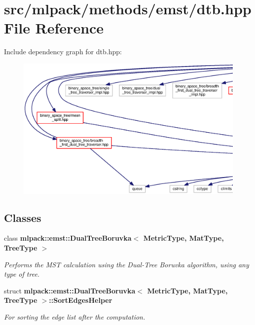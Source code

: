 \section{src/mlpack/methods/emst/dtb.hpp File Reference}
\label{dtb_8hpp}
Include dependency graph for dtb.\+hpp\+:
\nopagebreak
\begin{figure}[H]
\begin{center}
\leavevmode
\includegraphics[width=350pt]{dtb_8hpp__incl}
\end{center}
\end{figure}
\subsection*{Classes}
\begin{DoxyCompactItemize}
\item 
class {\bf mlpack\+::emst\+::\+Dual\+Tree\+Boruvka$<$ Metric\+Type, Mat\+Type, Tree\+Type $>$}
\begin{DoxyCompactList}\small\item\em Performs the M\+ST calculation using the Dual-\/\+Tree Boruvka algorithm, using any type of tree. \end{DoxyCompactList}\item 
struct {\bf mlpack\+::emst\+::\+Dual\+Tree\+Boruvka$<$ Metric\+Type, Mat\+Type, Tree\+Type $>$\+::\+Sort\+Edges\+Helper}
\begin{DoxyCompactList}\small\item\em For sorting the edge list after the computation. \end{DoxyCompactList}\end{DoxyCompactItemize}
